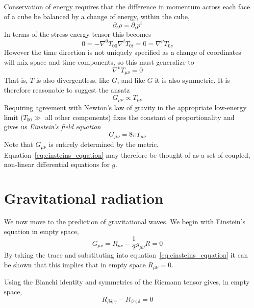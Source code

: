 Conservation of energy requires that the difference in momentum
across each face of a cube be balanced by a change of energy,
within the cube,
%
\begin{equation*}
\partial_t \rho = \partial_i p^i
\end{equation*}
%
In terms of the stress-energy tensor this becomes
%
\begin{equation*}
0 = - \nabla^0 T_{00} \nabla^i T_{0i} = 0
= \nabla^\nu T_{0 \nu}
\end{equation*}
%
However the time direction is not uniquely specified as a change of
coordinates will mix space and time components, so this must
generalize to 
%
\begin{equation*}
\nabla^\nu T_{\mu\nu} = 0
\end{equation*}
%
That is, $T$ is also divergentless, like $G$, and like $G$ it is also
symmetric.  It is therefore reasonable to suggest the ansatz
%
\begin{equation*}
G_{\mu\nu} \propto T_{\mu\nu}
\end{equation*}
%
Requiring agreement with Newton's law of gravity in the appropriate
low-energy limit ($T_{00} \gg$ all other components) fixes the
constant of proportionality and gives us \emph{Einstein's field
equation}
%
\begin{equation}
\label{eq:einsteins_equation}
G_{\mu\nu} = 8\pi T_{\mu\nu}
\end{equation}
%
Note that $G_{\mu\nu}$ is entirely determined by the metric.
Equation~\ref{eq:einsteins_equation} may therefore be thought of as a
set of coupled, non-linear differential equations for $g$.

\section{Gravitational radiation}
\label{sec:gravitational_radiation}

We now move to the prediction of gravitational waves.  We begin with
Einstein's equation in empty space,
%
\begin{equation*}
G_{\mu\nu} = R_{\mu\nu} - \frac{1}{2} g_{\mu\nu} R = 0
\end{equation*}
%
By taking the trace and substituting into equation~\ref{eq:einsteins_equation}
it can be shown that this implies that in empty space $R_{\mu\nu} =
0$.

Using the Bianchi identity and symmetries of the Riemann tensor gives,
in empty space,
%
\begin{equation}
\label{eq:divergence_in_empty_space}
R_{\beta\delta;\gamma}  -R_{\beta\gamma;\delta} = 0
\end{equation}

